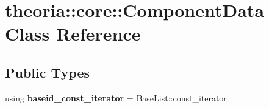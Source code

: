 \hypertarget{classtheoria_1_1core_1_1ComponentData}{\section{theoria\+:\+:core\+:\+:Component\+Data Class Reference}
\label{classtheoria_1_1core_1_1ComponentData}
}
\subsection*{Public Types}
\begin{DoxyCompactItemize}
\item 
\hypertarget{classtheoria_1_1core_1_1ComponentData_a66b4a86a617891cfd780d447c82b88b0}{using {\bfseries baseid\+\_\+const\+\_\+iterator} = Base\+List\+::const\+\_\+iterator}\label{classtheoria_1_1core_1_1ComponentData_a66b4a86a617891cfd780d447c82b88b0}

\end{DoxyCompactItemize}
